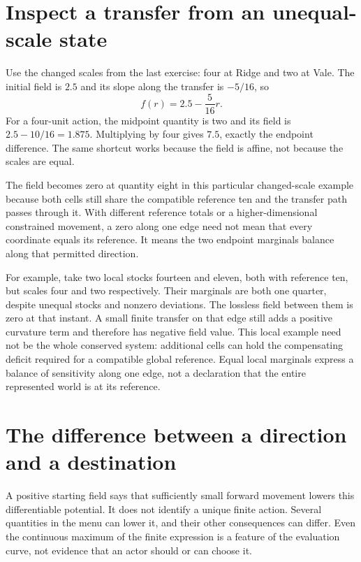 \section{Inspect a transfer from an unequal-scale state}

Use the changed scales from the last exercise: four at Ridge and two at Vale. The initial field is \(2.5\) and its slope along the transfer is \(-5/16\), so
\begin{equation}
f(r)=2.5-\frac5{16}r.
\end{equation}
For a four-unit action, the midpoint quantity is two and its field is \(2.5-10/16=1.875\). Multiplying by four gives \(7.5\), exactly the endpoint difference. The same shortcut works because the field is affine, not because the scales are equal.

The field becomes zero at quantity eight in this particular changed-scale example because both cells still share the compatible reference ten and the transfer path passes through it. With different reference totals or a higher-dimensional constrained movement, a zero along one edge need not mean that every coordinate equals its reference. It means the two endpoint marginals balance along that permitted direction.

For example, take two local stocks fourteen and eleven, both with reference ten, but scales four and two respectively. Their marginals are both one quarter, despite unequal stocks and nonzero deviations. The lossless field between them is zero at that instant. A small finite transfer on that edge still adds a positive curvature term and therefore has negative field value. This local example need not be the whole conserved system: additional cells can hold the compensating deficit required for a compatible global reference. Equal local marginals express a balance of sensitivity along one edge, not a declaration that the entire represented world is at its reference.

\section{The difference between a direction and a destination}

A positive starting field says that sufficiently small forward movement lowers this differentiable potential. It does not identify a unique finite action. Several quantities in the menu can lower it, and their other consequences can differ. Even the continuous maximum of the finite expression is a feature of the evaluation curve, not evidence that an actor should or can choose it.

